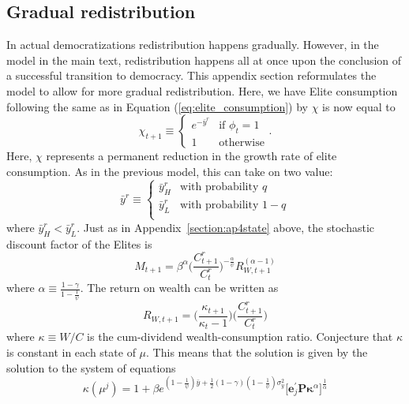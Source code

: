 \documentclass[12pt]{article}
\numberwithin{equation}{section}
\begin{document}
\subsection{Gradual redistribution}\label{section:gradual_redist}

In actual democratizations redistribution happens gradually. However, in the model in the main text, redistribution happens all at once upon the conclusion of a successful transition to democracy. This appendix section reformulates the model to allow for more gradual redistribution. Here, we have Elite consumption following the same as in Equation (\ref{eq:elite_consumption}) by $\chi$ is now equal to
\begin{equation}
\chi_{t+1} \equiv \begin{cases} 
e^{- \bar{y}^r} & \textrm{if }\phi_{t}=1 \\
1 & \textrm{otherwise}
\end{cases}.
\end{equation}
Here, $\chi$ represents a permanent reduction in the growth rate of elite consumption. As in the previous model, this can take on two value:
\begin{equation}
\bar{y}^r \equiv \begin{cases} 
 \bar{y}^r_H & \textrm{with probability }q \\
 \bar{y}^r_L & \textrm{with probability }1-q \\
\end{cases} 
\end{equation}
where $\bar{y}^r_H < \bar{y}^r_L$. Just as in Appendix~\ref{section:ap4state} above, the stochastic discount factor of the Elites is
\[
M_{t+1}=\beta^{\alpha}\bigg(\frac{C_{t+1}^r}{C_{t}^r}\bigg)^{-\frac{\alpha}{\psi}}R_{W,t+1}^{(\alpha-1)}
\]
where $\alpha \equiv \frac{1-\gamma}{1-\frac{1}{\psi}}$. The return on wealth can be written as
\begin{equation}
R_{W,t+1} = \bigg(\frac{\kappa_{t+1}}{\kappa_t - 1}\bigg)\bigg(\frac{C_{t+1}^r}{C_{t}^r}\bigg)
\end{equation}
where $\kappa \equiv W/C$ is the cum-dividend wealth-consumption ratio. Conjecture that $\kappa$ is constant in each state of $\mu$.  This means that the solution is given by the solution to the system of equations
\begin{equation}
\kappa(\mu^j)=1+\beta e^{(1-\frac{1}{\psi})\bar{y}+\frac{1}{2}(1-\gamma)(1-\frac{1}{\psi})\sigma_y^2} \bigg[\mathbf{e}_j^\prime \mathbf{P}\boldsymbol\kappa^{\alpha}\bigg]^{\frac{1}{\alpha}}
\end{equation}
\end{document}
